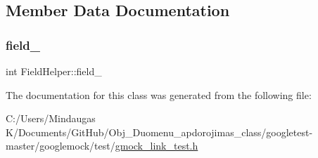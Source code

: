 \subsection{Member Data Documentation}
\mbox{\label{class_field_helper_a50a7ec9efc60377363d5ce8bea1708ac}} 
\subsubsection{\texorpdfstring{field\_}{field\_}}
{\footnotesize\ttfamily int Field\+Helper\+::field\+\_\+}



The documentation for this class was generated from the following file\+:\begin{DoxyCompactItemize}
\item 
C\+:/\+Users/\+Mindaugas K/\+Documents/\+Git\+Hub/\+Obj\+\_\+\+Duomenu\+\_\+apdorojimas\+\_\+class/googletest-\/master/googlemock/test/\mbox{\hyperlink{googletest-master_2googlemock_2test_2gmock__link__test_8h}{gmock\+\_\+link\+\_\+test.\+h}}\end{DoxyCompactItemize}
